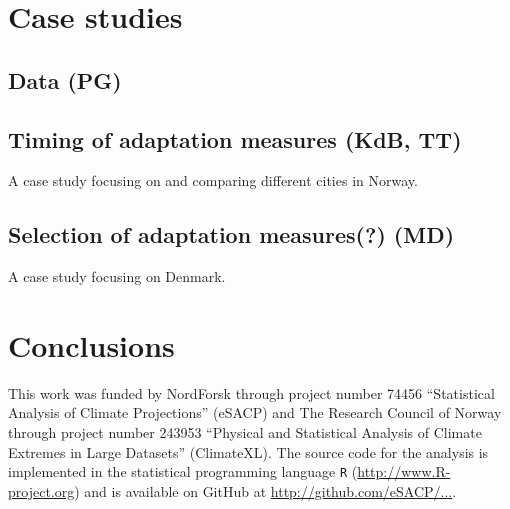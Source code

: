 \documentclass[wrr, draft]{agutex}
\begin{document}
\begin{article}
\section{Case studies}

\subsection{Data {\color{blue} (PG)}}

\subsection{Timing of adaptation measures {\color{blue} (KdB, TT)}}

A case study focusing on and comparing different cities in Norway.

\subsection{Selection of adaptation measures(?) {\color{blue} (MD)}}

A case study focusing on Denmark. 

\section{Conclusions}

\begin{acknowledgments}
This work was funded by NordForsk through project number 74456 ``Statistical Analysis of Climate Projections'' (eSACP) and The Research Council of Norway through project number 243953 ``Physical and Statistical Analysis of Climate Extremes in Large Datasets'' (ClimateXL). The source code for the analysis is implemented in the statistical programming language {\tt R} (\url{http://www.R-project.org}) and is available on GitHub at \url{http://github.com/eSACP/...}.
\end{acknowledgments}







\end{article}

\end{document}
